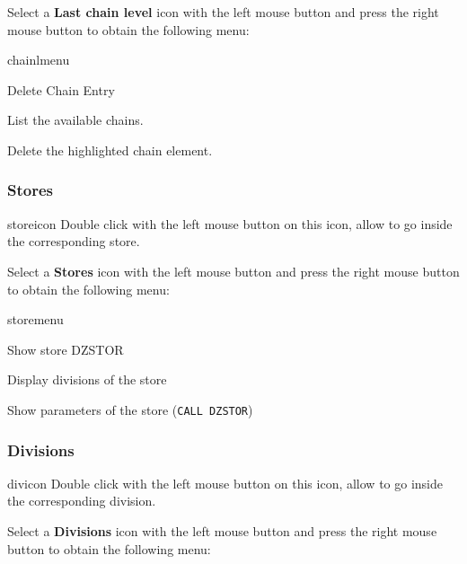 Select a {\bf Last chain level} icon with the left mouse button and press
the right mouse button to obtain the following menu:

\begin{PAWf}[.2]{chainlmenu}
\begin{DLsf}{Delete Chain Entry}
\item[List]                      List the available chains.
\item[Delete Chain Entry]        Delete the highlighted chain element.
\end{DLsf}
\end{PAWf}

\subsubsection{\ZEBRA{} Stores}
\begin{ICON}{storeicon}
Double click with the left mouse button on this icon, allow to go inside the
corresponding \ZEBRA{} store.
\end{ICON}

Select a {\bf \ZEBRA{} Stores} icon with the left mouse button and press
the right mouse button to obtain the following menu:

\begin{PAWf}{storemenu}
\begin{DLsf}{Show store DZSTOR}
\item[List]                      Display divisions of the store 
\item[Show store DZSTOR] Show parameters of the store (\texttt{CALL
                         DZSTOR})
\end{DLsf}
\end{PAWf}

\subsubsection{\ZEBRA{} Divisions}
\begin{ICON}{divicon}
Double click with the left mouse button on this icon, allow to go inside the
corresponding \ZEBRA{} division.
\end{ICON}

Select a {\bf \ZEBRA{} Divisions} icon with the left mouse button and press
the right mouse button to obtain the following menu:


